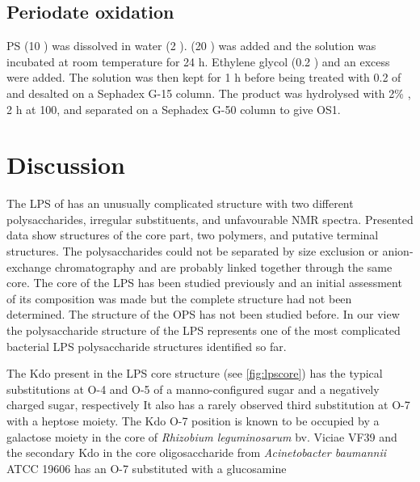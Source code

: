 	\subsection{Periodate oxidation} %
	\label{sub:periodate_oxidation}

		 \ac{PS} (10 \milligram) was dissolved in water (2 \millilitre).  (20 \milligram) was added and the solution was incubated at room temperature for 24 h. Ethylene glycol (0.2 \millilitre) and an excess  were added. The solution was then kept for 1 h before being treated with 0.2 \millilitre of  and desalted on a Sephadex G-15 column. The product was hydrolysed with 2\% , 2 h at 100\cel, and  separated on a Sephadex G-50 column to give \ac{OS}1.

\section{Discussion} %
\label{sec:discussion}

	The \ac{LPS} of \caulobacter has an unusually complicated structure with two different polysaccharides, irregular substituents, and unfavourable \ac{NMR} spectra. Presented data show structures of the core part, two polymers, and putative terminal structures. The polysaccharides could not be separated by size exclusion or anion-exchange chromatography and are probably linked together through the same core. The core of the \caulobacter{} \ac{LPS} has been studied previously and an initial assessment of its composition was made but the complete structure had not been determined. The structure of the \ac{OPS} has not been studied before. In our view the polysaccharide structure of the \caulobacter{} \ac{LPS} represents one of the most complicated bacterial \ac{LPS} polysaccharide structures identified so far.

	The Kdo present in the \ac{LPS} core structure (see \cref{fig:lpscore}) has the typical substitutions at O-4 and O-5 of a manno-configured sugar and a negatively charged sugar, respectively It also has a rarely observed third substitution at O-7 with a heptose moiety. The Kdo O-7 position is known to be occupied by a galactose moiety in the core of \textit{Rhizobium leguminosarum} bv. Viciae VF39 and the secondary Kdo in the core oligosaccharide from \textit{Acinetobacter baumannii} ATCC 19606 has an O-7 substituted with a glucosamine

